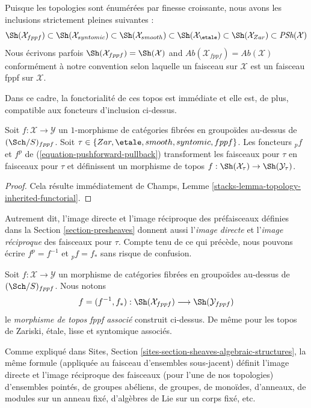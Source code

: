 \medskip\noindent
Puisque les topologies sont énumérées par finesse croissante, nous avons
les inclusions strictement pleines suivantes :
$$
\Sh(\mathcal{X}_{fppf}) \subset
\Sh(\mathcal{X}_{syntomic}) \subset
\Sh(\mathcal{X}_{smooth}) \subset
\Sh(\mathcal{X}_\etale) \subset
\Sh(\mathcal{X}_{Zar}) \subset \textit{PSh}(\mathcal{X})
$$
Nous écrivons parfois
$\Sh(\mathcal{X}_{fppf}) = \Sh(\mathcal{X})$
and
$\textit{Ab}(\mathcal{X}_{fppf}) = \textit{Ab}(\mathcal{X})$
conformément à notre convention selon laquelle un faisceau sur $\mathcal{X}$
est un faisceau fppf sur $\mathcal{X}$.

\medskip\noindent
Dans ce cadre, la fonctorialité de ces topos est immédiate et
elle est, de plus, compatible aux foncteurs d'inclusion ci-dessus.

\begin{lemma}
\label{lemma-functoriality-sheaves}
Soit $f : \mathcal{X} \to \mathcal{Y}$ un $1$-morphisme de catégories
fibrées en groupoïdes au-dessus de $(\Sch/S)_{fppf}$. Soit
$\tau \in \{Zar, \etale, smooth, syntomic, fppf\}$.
Les foncteurs ${}_pf$ et $f^p$ de (\ref{equation-pushforward-pullback})
transforment les faisceaux pour $\tau$ en faisceaux pour $\tau$ et définissent un morphisme
de topos
$f : \Sh(\mathcal{X}_\tau) \to \Sh(\mathcal{Y}_\tau)$.
\end{lemma}

\begin{proof}
Cela résulte immédiatement de
Champs, Lemme \ref{stacks-lemma-topology-inherited-functorial}.
\end{proof}

\noindent
Autrement dit, l'image directe et l'image réciproque des préfaisceaux définies dans la
Section \ref{section-presheaves}
donnent aussi l'{\it image directe} et l'{\it image réciproque} des faisceaux pour $\tau$.
Compte tenu de ce qui précède, nous pouvons écrire $f^p = f^{-1}$
et ${}_pf = f_*$ sans risque de confusion.

\begin{definition}
\label{definition-morphism}
Soit $f : \mathcal{X} \to \mathcal{Y}$ un morphisme de catégories
fibrées en groupoïdes au-dessus de $(\Sch/S)_{fppf}$. Nous notons
$$
f = (f^{-1}, f_*) :
\Sh(\mathcal{X}_{fppf})
\longrightarrow
\Sh(\mathcal{Y}_{fppf})
$$
le {\it morphisme de topos fppf associé} construit ci-dessus.
De même pour les topos de Zariski, étale, lisse et syntomique associés.
\end{definition}

\noindent
Comme expliqué dans
Sites, Section \ref{sites-section-sheaves-algebraic-structures},
la même formule (appliquée au faisceau d'ensembles sous-jacent) définit
l'image directe et l'image réciproque des faisceaux (pour l'une de nos topologies)
d'ensembles pointés, de groupes abéliens, de groupes, de monoïdes, d'anneaux, de modules
sur un anneau fixé, d'algèbres de Lie sur un corps fixé, etc.








